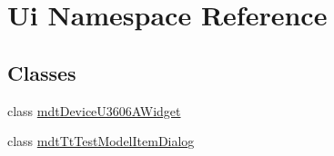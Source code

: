 \hypertarget{namespace_ui}{\section{Ui Namespace Reference}
\label{namespace_ui}
}
\subsection*{Classes}
\begin{DoxyCompactItemize}
\item 
class \hyperlink{class_ui_1_1mdt_device_u3606_a_widget}{mdt\-Device\-U3606\-A\-Widget}
\item 
class \hyperlink{class_ui_1_1mdt_tt_test_model_item_dialog}{mdt\-Tt\-Test\-Model\-Item\-Dialog}
\end{DoxyCompactItemize}
